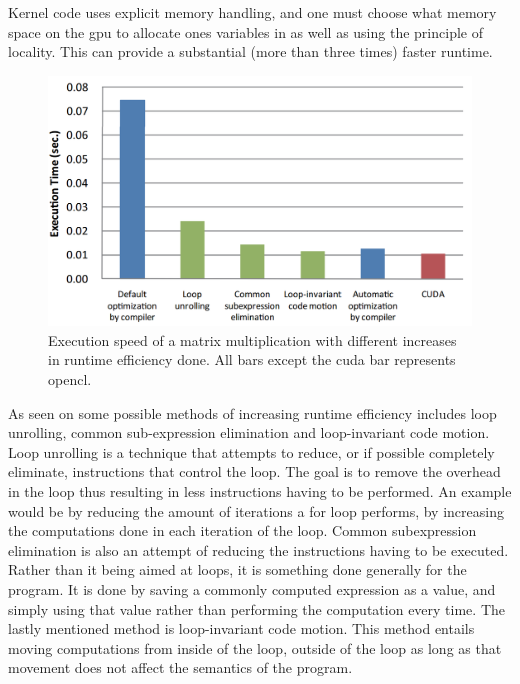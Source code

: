 Kernel code uses explicit memory handling, and one must choose what memory space on the \acrshort{gpu} to allocate ones variables in as well as using the principle of locality.
This can provide a substantial (more than three times) faster runtime. \citep{ocl_lecture3}
\begin{figure}[h]
\centering	
 \includegraphics[width=1\textwidth]{figures/opencloptimisation.png} %
\caption{Execution speed of a matrix multiplication with different increases in runtime efficiency done. All bars except the \gls{cuda} bar represents \gls{opencl}.  \citep{CUDAOpenCLOptimisation}}\label{image:OpenCLOptCompare}
\vspace{-15pt}
\end{figure}
As seen on  some possible methods of increasing runtime efficiency includes loop unrolling, common sub-expression elimination and loop-invariant code motion. 
Loop unrolling is a technique that attempts to reduce, or if possible completely eliminate, instructions that control the loop.
The goal is to remove the overhead in the loop thus resulting in less instructions having to be performed.
An example would be by reducing the amount of iterations a for loop performs, by increasing the computations done in each iteration of the loop.
Common subexpression elimination is also an attempt of reducing the instructions having to be executed.
Rather than it being aimed at loops, it is something done generally for the program.
It is done by saving a commonly computed expression as a value, and simply using that value rather than performing the computation every time.
The lastly mentioned method is loop-invariant code motion.
This method entails moving computations from inside of the loop, outside of the loop as long as that movement does not affect the semantics of the program.

